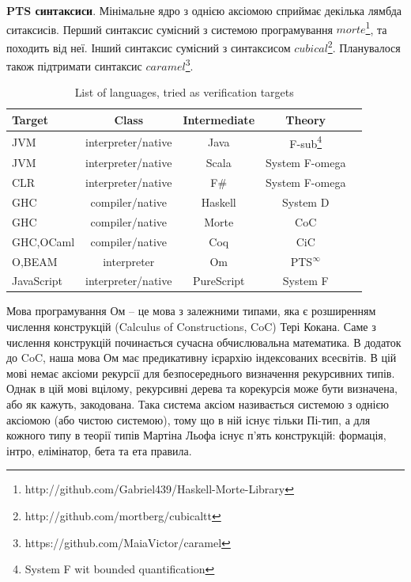 \begin{definition}
\begin{definition}
\begin{definition}
\begin{definition}
{\bf PTS синтаксиси}. Мінімальне ядро з однією аксіомою
сприймає декілька лямбда ситаксисів.
Перший синтаксис сумісний з системою програмування
$morte$\footnote{http://github.com/Gabriel439/Haskell-Morte-Library}, та походить від неї.
Інший синтаксис сумісний з синтаксисом $cubical$\footnote{http://github.com/mortberg/cubicaltt}.
Планувалося також підтримати синтаксис $caramel$\footnote{https://github.com/MaiaVictor/caramel}.

\begin{table}[h]
\begin{center}
\caption{List of languages, tried as verification targets}
\label{tab:a}
\begin{tabular}{lcccc}
\hline
{\bf Target} & {\bf Class} & {\bf Intermediate} & {\bf Theory}\\
\hline
JVM        & interpreter/native   & Java       & F-sub\footnote{System F wit bounded quantification}\\
JVM        & interpreter/native   & Scala      & System F-omega\\
CLR        & interpreter/native   & F\#        & System F-omega\\
GHC        & compiler/native      & Haskell    & System D\\
GHC        & compiler/native      & Morte      & CoC\\
GHC,OCaml  & compiler/native      & Coq        & CiC\\
O,BEAM     & interpreter          & Om         & PTS$^\infty$ \\
JavaScript & interpreter/native   & PureScript & System F\\
\hline
\end{tabular}
\end{center}
\end{table}

Мова програмування Ом -- це мова з залежними типами, яка є розширенням
числення конструкцій (Calculus of Constructions, CoC) Тері Кокана. Саме з числення
конструкцій починається сучасна обчислювальна математика. В додаток до CoC,
наша мова Ом має предикативну ієрархію індексованих всесвітів. В цій мові немає
аксіоми рекурсії для безпосереднього визначення рекурсивних типів. Однак в цій мові
вцілому, рекурсивні дерева та корекурсія може бути визначена, або як кажуть, закодована.
Така система аксіом називається системою з однією аксіомою (або чистою системою), тому що в ній
існує тільки Пі-тип, а для кожного типу в теорії типів Мартіна Льофа існує п'ять
конструкцій: формація, інтро, елімінатор, бета та ета правила.


\end{definition}
\end{definition}
\end{definition}
\end{definition}
